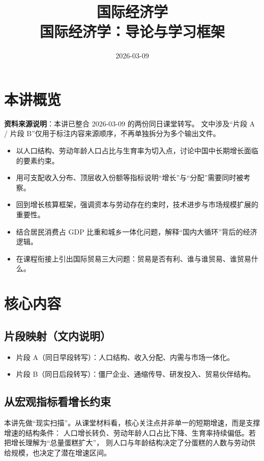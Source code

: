 \documentclass[UTF8,11pt,a4paper]{ctexart}
\title{ 国际经济学 \\ \large 国际经济学：导论与学习框架 }
\author{}
\date{2026-03-09}
\begin{document}
\maketitle

\section{本讲概览}

\textbf{资料来源说明}：本讲已整合 2026-03-09 的两份同日课堂转写。
文中涉及“片段 A / 片段 B”仅用于标注内容来源顺序，不再单独拆分为多个输出文件。

\begin{itemize}
  \item 以人口结构、劳动年龄人口占比与生育率为切入点，讨论中国中长期增长面临的要素约束。
  \item 用可支配收入分布、顶层收入份额等指标说明“增长”与“分配”需要同时被考察。
  \item 回到增长核算框架，强调资本与劳动存在约束时，技术进步与市场规模扩展的重要性。
  \item 结合居民消费占 GDP 比重和城乡一体化问题，解释“国内大循环”背后的经济逻辑。
  \item 在课程衔接上引出国际贸易三大问题：贸易是否有利、谁与谁贸易、谁贸易什么。
\end{itemize}

\section{核心内容}

\subsection*{片段映射（文内说明）}

\begin{itemize}
  \item 片段 A（同日早段转写）：人口结构、收入分配、内需与市场一体化。
  \item 片段 B（同日后段转写）：僵尸企业、通缩传导、研发投入、贸易伙伴结构。
\end{itemize}

\subsection{从宏观指标看增长约束}

本讲先做“现实扫描”。从课堂材料看，核心关注点并非单一的短期增速，而是支撑增速的结构条件：
人口增长转负、劳动年龄人口占比下降、生育率持续偏低。若把增长理解为“总量蛋糕扩大”，
则人口与年龄结构决定了分蛋糕的人数与劳动供给规模，也决定了潜在增速区间。
\end{document}
